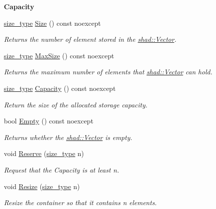 \begin{Indent}{\bf Capacity}\par
\begin{DoxyCompactItemize}
\item 
\hyperlink{classshad_1_1Vector_a1c97f4eb87d738cb4de97e5b3587c397}{size\-\_\-type} \hyperlink{classshad_1_1Vector_acc82ec6a8baf31c7b33cfde87309fffe}{Size} () const noexcept
\begin{DoxyCompactList}\small\item\em Returns the number of element stored in the \hyperlink{classshad_1_1Vector}{shad\-::\-Vector}. \end{DoxyCompactList}\item 
\hyperlink{classshad_1_1Vector_a1c97f4eb87d738cb4de97e5b3587c397}{size\-\_\-type} \hyperlink{classshad_1_1Vector_abf3456999188ff7f9e43ca8d1e7d4bff}{Max\-Size} () const noexcept
\begin{DoxyCompactList}\small\item\em Returns the maximum number of elements that \hyperlink{classshad_1_1Vector}{shad\-::\-Vector} can hold. \end{DoxyCompactList}\item 
\hyperlink{classshad_1_1Vector_a1c97f4eb87d738cb4de97e5b3587c397}{size\-\_\-type} \hyperlink{classshad_1_1Vector_acba3d706d24f0b871dc05423692ac592}{Capacity} () const noexcept
\begin{DoxyCompactList}\small\item\em Return the size of the allocated storage capacity. \end{DoxyCompactList}\item 
bool \hyperlink{classshad_1_1Vector_ae3eb293e1a9f7b64ca1a77e40caef993}{Empty} () const noexcept
\begin{DoxyCompactList}\small\item\em Returns whether the \hyperlink{classshad_1_1Vector}{shad\-::\-Vector} is empty. \end{DoxyCompactList}\item 
void \hyperlink{classshad_1_1Vector_aaba27b70744d34815776697084245777}{Reserve} (\hyperlink{classshad_1_1Vector_a1c97f4eb87d738cb4de97e5b3587c397}{size\-\_\-type} n)
\begin{DoxyCompactList}\small\item\em Request that the Capacity is at least n. \end{DoxyCompactList}\item 
void \hyperlink{classshad_1_1Vector_a52c6d1d7790dda2722f1c9a95ae66d3b}{Resize} (\hyperlink{classshad_1_1Vector_a1c97f4eb87d738cb4de97e5b3587c397}{size\-\_\-type} n)
\begin{DoxyCompactList}\small\item\em Resize the container so that it contains n elements. \end{DoxyCompactList}\end{DoxyCompactItemize}
\end{Indent}
